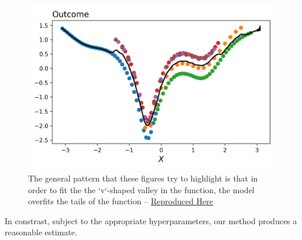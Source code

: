 \documentclass[a4paper,12pt]{article}
\begin{document}
\begin{figure}[htbp]
\includegraphics[scale=0.3]{figures/framework/local_linear_no_const_15.0_18_LM.png}
\caption{The general pattern that these figures try to highlight is that in order to fit the the `v`-shaped valley in the function, the model overfits the tails of the function -- \href{https://github.com/pharringtonp19/rfp/blob/main/notebooks/local_weighted_linear_regression_no_avg_effect_LM.ipynb}{Reproduced Here}}
\label{fig:nonparametrics}
\end{figure}
In constrast, subject to the appropriate hyperparameters, our method produces a reasonable estimate.
\end{document}
